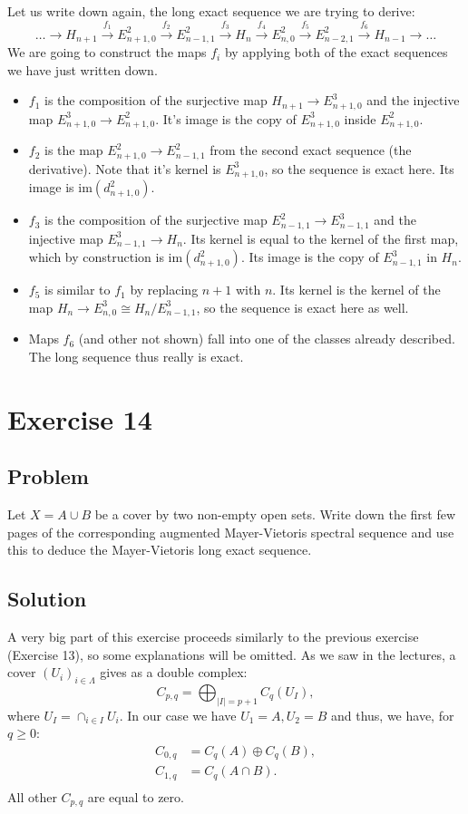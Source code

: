 \documentclass{article}
\begin{document}
\noindent
Let us write down again, the long exact sequence we are trying to derive:
\begin{equation*}
\dots \to H_{n+1} \xrightarrow{f_1} E^2_{n+1,0} \xrightarrow{f_2}  E^2_{n-1,1} \xrightarrow{f_3}  H_n \xrightarrow{f_4}  E^2_{n,0} \xrightarrow{f_5}  E^2_{n-2,1} \xrightarrow{f_6}  H_{n-1} \to \dots
\end{equation*}
We are going to construct the maps $f_i$ by applying both of the exact sequences we have just written down.
\begin{itemize}
\item $f_1$ is the composition of the surjective map $H_{n+1} \to E_{n+1,0}^3$ and the injective map $E^3_{n+1,0} \to E^2_{n+1,0}$. It's image is the copy of $E^3_{n+1,0}$ inside $E^2_{n+1,0}$.
\item $f_2$ is the map $E^2_{n+1,0} \to E^2_{n-1,1}$ from the second exact sequence (the derivative). Note that it's kernel is $E^3_{n+1,0}$, so the sequence is exact here. Its image is $\mathrm{im}(d^2_{n+1,0})$.
\item $f_3$ is the composition of the surjective map $E^2_{n-1,1} \to E^3_{n-1,1}$ and the injective map $E^3_{n-1,1} \to H_n$. Its kernel is equal to the kernel of the first map, which by construction is $\mathrm{im}(d^2_{n+1,0})$. Its image is the copy of $E^3_{n-1,1}$ in $H_n$.
\item $f_5$ is similar to $f_1$ by replacing $n+1$ with $n$. Its kernel is the kernel of the map $H_n \to E_{n,0}^3 \cong H_n/E^3_{n-1,1}$, so the sequence is exact here as well.
\item Maps $f_6$ (and other not shown) fall into one of the classes already described. The long sequence thus really is exact. 
\end{itemize}
\newpage
\section*{Exercise 14}
\subsection*{Problem}
Let $X = A \cup B$ be a cover by two non-empty open sets. Write down the first few pages of the
corresponding augmented Mayer-Vietoris spectral sequence and use this to deduce the Mayer-Vietoris long exact sequence. 
\subsection*{Solution}
A very big part of this exercise proceeds similarly to the previous exercise (Exercise 13), so some explanations will be omitted.
As we saw in the lectures, a cover $(U_i)_{i \in \Lambda}$ gives as a double complex:
\begin{equation*}
C_{p,q} = \bigoplus_{|I| = p+1} C_q (U_I),
\end{equation*}
where $U_I = \cap_{i \in I} U_i$. In our case we have $U_1 = A, U_2 = B$ and thus, we have, for $q \geq 0$:
\begin{align*}
C_{0,q} &= C_q(A) \oplus C_q(B), \\
C_{1,q} &= C_q(A \cap B). \\
\end{align*}
All other $C_{p,q}$ are equal to zero.
\end{document}
